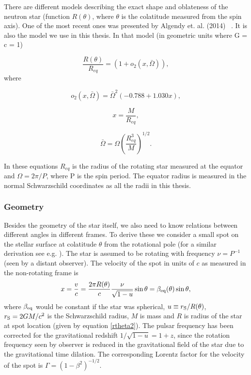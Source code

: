 \documentclass{wihuri}
\def\rg{r_{\rm S}} %
\def\rg{r_{\rm S}} %
\begin{document}
There are different models describing the exact shape and oblateness of the neutron star (function $R(\theta)$, where $\theta$ is the colatitude measured from the spin axis).
One of the most recent ones was presented by Algendy et. al. (2014) ~\cite{algendy}. 
It is also the model we use in this thesis. In that model (in geometric units
where G = c = 1)

\begin{equation}
\label{rtheta2}
\frac{R(\theta)}{R_{eq}} = (1 + o_{2}(x,\bar{\Omega})),
\end{equation}
where


\begin{equation}
\label{otwo}
o_{2}(x,\bar{\Omega}) = \bar{\Omega}^{2}(-0.788+1.030x),
\end{equation}


\begin{equation}
\label{rtheta2x}
x = \frac{M}{R_{eq}},
\end{equation}


\begin{equation}
\label{rtheta2omega}
\bar{\Omega} = \Omega (\frac{R_{eq}^{3}}{M})^{1/2}.
\end{equation}


In these equations $R_{eq}$ is the radius of the rotating star measured at the equator and $\Omega = 2\pi/P$, where P is the spin period. The equator radius is measured in the normal Schwarzschild coordinates as all the radii in this thesis.


\subsubsection{Geometry}

Besides the geometry of the star itself, we also need to know relations between different angles in different frames. To derive these we consider a small spot on the stellar surface at colatitude $\theta$ from the rotational pole (for a similar derivation see e.g. \cite{poutabelo}). 
The star is assumed to be rotating  with frequency $\nu=P^{-1}$ (seen by a distant observer).
The velocity of the spot in units of $c$ as measured in the non-rotating frame is 
\begin{equation}
\label{beta2}
x = \frac{v}{c}=\frac{2\pi R(\theta)}{c} \frac{\nu}{\sqrt{1-u}} \sin\theta =\beta_{\rm eq}(\theta) \sin\theta,
\end{equation}
where $\beta_{\rm eq}$ would be constant if the star was spherical, $u\equiv\rg/R(\theta)$, 
$\rg=2GM/c^2$ is the Schwarzschild radius, $M$ is mass and $R$ is
radius of the star at spot location (given by equation \ref{rtheta2}). The pulsar frequency has been corrected for the gravitational redshift $1/\sqrt{1-u}=1+z$, since the rotation frequency seen by observer is reduced in the gravitational field of the star due to the gravitational time dilation. The corresponding Lorentz factor for the velocity of the spot is $\Gamma=(1-\beta^2)^{-1/2}$.
\end{document}

